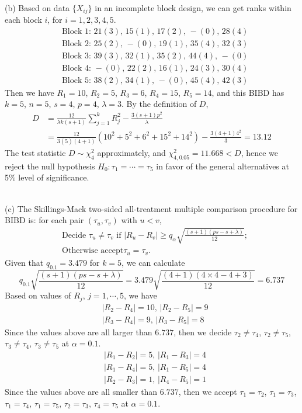 \documentclass[12pt,a4paper]{article}
\begin{document}
~\\
(b) Based on data $\{X_{ij}\}$ in an incomplete block design, we can get ranks within each block $i$, for $i=1,2,3,4,5$.
\begin{align*}
&\text{Block 1: }21(3) \text{, } 15(1) \text{, } 17(2) \text{, } -(0) \text{, } 28(4)\\
&\text{Block 2: }25(2) \text{, } -(0) \text{, } 19(1) \text{, } 35(4) \text{, } 32(3)\\
&\text{Block 3: }39(3) \text{, } 32(1) \text{, } 35(2) \text{, } 44(4) \text{, } -(0)\\
&\text{Block 4: }-(0) \text{, } 22(2) \text{, } 16(1) \text{, } 24(3) \text{, } 30(4)\\
&\text{Block 5: }38(2) \text{, } 34(1) \text{, } -(0) \text{, } 45(4) \text{, } 42(3)
\end{align*}
Then we have $R_{1}=10$, $R_{2}=5$, $R_{3}=6$, $R_{4}=15$, $R_{5}=14$, and this BIBD has $k=5$, $n=5$, $s=4$, $p=4$, $\lambda=3$. By the definition of $D$,
\begin{align*}
D&=\frac{12}{\lambda k(s+1)}\sum_{j=1}^{k}R_{j}^{2}-\frac{3(s+1)p^{2}}{\lambda}\\
&=\frac{12}{3 (5)(4+1)}(10^{2}+5^{2}+6^{2}+15^{2}+14^{2})-\frac{3(4+1)4^{2}}{3}=13.12
\end{align*}
The test statistic $D\sim \chi_{4}^{2}$ approximately, and $\chi_{4,0.05}^{2}=11.668<D$, hence we reject the null hypothesis $H_{0}:\tau_{1}=\cdots=\tau_{5}$ in favor of the general alternatives at 5\% level of significance.

~\\
(c) The Skillings-Mack two-sided all-treatment multiple comparison procedure for BIBD is: for each pair $(\tau_{u},\tau_{v})$ with $u<v$,
\begin{align*}
&\text{Decide }\tau_{u}\neq\tau_{v}\text{ if } |R_{u}-R_{v}|\geqslant q_{\alpha}\sqrt{\frac{(s+1)(ps-s+\lambda)}{12}};\\
&\text{Otherwise accept}\tau_{u}=\tau_{v}.
\end{align*}
Given that $q_{0.1}=3.479$ for $k=5$, we can calculate
$$q_{0.1}\sqrt{\frac{(s+1)(ps-s+\lambda)}{12}}=3.479\sqrt{\frac{(4+1)(4\times 4-4+3)}{12}}=6.737$$
Based on values of $R_{j}$, $j=1,\cdots,5$, we have
\begin{align*}
&|R_{2}-R_{4}|=10 \text{, } |R_{2}-R_{5}|=9\\
&|R_{3}-R_{4}|=9 \text{, } |R_{3}-R_{5}|=8
\end{align*}
Since the values above are all larger than $6.737$, then we decide $\tau_{2}\neq\tau_{4}$, $\tau_{2}\neq\tau_{5}$, $\tau_{3}\neq\tau_{4}$, $\tau_{3}\neq\tau_{5}$ at $\alpha=0.1$.
\begin{align*}
&|R_{1}-R_{2}|=5 \text{, } |R_{1}-R_{3}|=4\\
&|R_{1}-R_{4}|=5 \text{, } |R_{1}-R_{5}|=4\\
&|R_{2}-R_{3}|=1 \text{, } |R_{4}-R_{5}|=1
\end{align*}
Since the values above are all smaller than $6.737$, then we accept $\tau_{1}=\tau_{2}$, $\tau_{1}=\tau_{3}$, $\tau_{1}=\tau_{4}$, $\tau_{1}=\tau_{5}$, $\tau_{2}=\tau_{3}$, $\tau_{4}=\tau_{5}$ at $\alpha=0.1$.
\end{document}
